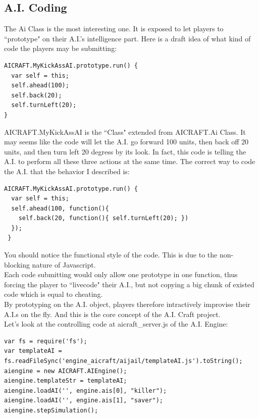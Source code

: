 \documentclass[12pt]{article}
\begin{document}
\subsection{A.I. Coding}
The Ai Class is the most interesting one. It is exposed to let players to ``prototype" on their A.I.'s intelligence part. Here is a draft idea of what kind of code the players may be submitting:
\begin{verbatim}
AICRAFT.MyKickAssAI.prototype.run() {
  var self = this;
  self.ahead(100);
  self.back(20);
  self.turnLeft(20);
}
\end{verbatim}

AICRAFT.MyKickAssAI is the ``Class" extended from AICRAFT.Ai Class. It may seems like the code will let the A.I. go forward 100 units, then back off 20 units, and then turn left 20 degress by its look. In fact, this code is telling the A.I. to perform all these three actions at the same time. The correct way to code the A.I. that the behavior I described is:\\ 

\begin{verbatim}
AICRAFT.MyKickAssAI.prototype.run() {
  var self = this;
  self.ahead(100, function(){
    self.back(20, function(){ self.turnLeft(20); })	
  });
 }
\end{verbatim}

You should notice the functional style of the code. This is due to the non-blocking nature of Javascript.\\

Each code submitting would only allow one prototype in one function, thus forcing the player to ``livecode" their A.I., but not copying a big chunk of existed code which is equal to cheating.\\

By prototyping on the A.I. object, players therefore intractively improvise their A.I.s on the fly. And this is the core concept of the A.I. Craft project.\\

Let's look at the controlling code at aicraft\_server.js of the A.I. Engine:\\

\begin{verbatim}
var fs = require('fs');
var templateAI = fs.readFileSync('engine_aicraft/aijail/templateAI.js').toString();
aiengine = new AICRAFT.AIEngine();
aiengine.templateStr = templateAI;
aiengine.loadAI('', engine.ais[0], "killer");
aiengine.loadAI('', engine.ais[1], "saver");
aiengine.stepSimulation();
\end{verbatim}
\end{document}
